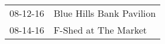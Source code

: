 \begin{supertabular}{p{0.07\textwidth}p{0.23\textwidth}}
 08-12-16 &  Blue Hills Bank Pavilion \\
 08-14-16 &      F-Shed at The Market \\
\end{supertabular}
